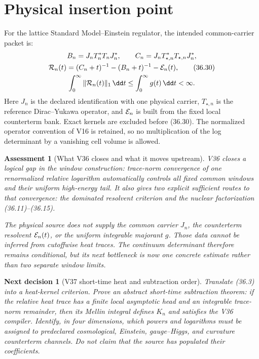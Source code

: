 \documentclass[11pt]{article}
\newtheorem{decision}[theorem]{Next decision}
\newtheorem{assessment}[theorem]{Assessment}
\theoremstyle{remark}
\begin{document}
\section{Physical insertion point}

For the lattice Standard Model--Einstein regulator, the intended
common-carrier packet is:
\[
\begin{gathered}
 B_n=J_nT_n^*T_nJ_n^*,\qquad
 C_n=J_nT_{\star,n}^*T_{\star,n}J_n^*,\\
 {\cal R}_n(t)=
 (C_n+t)^{-1}-(B_n+t)^{-1}-{\cal E}_n(t),                \tag{36.30}\\
 \int_0^\infty\|{\cal R}_n(t)\|_1\,\dd t
 \leq\int_0^\infty g(t)\,\dd t<\infty.
\end{gathered}
\]
Here \(J_n\) is the declared identification with one physical
carrier, \(T_{\star,n}\) is the reference Dirac--Yukawa operator,
and \({\cal E}_n\) is built from the fixed local counterterm bank.
Exact kernels are excluded before (36.30).  The normalized
operator convention of V16 is retained, so no multiplication of the
log determinant by a vanishing cell volume is allowed.

\begin{assessment}[What V36 closes and what it moves upstream]
\label{ass:v15v36-closes}
V36 closes a logical gap in the window construction: trace-norm
convergence of one renormalized relative logarithm automatically
controls all fixed common windows and their uniform high-energy
tail.  It also gives two explicit sufficient routes to that
convergence: the dominated resolvent criterion and the nuclear
factorization (36.11)--(36.15).

The physical source does not supply the common carrier \(J_n\), the
counterterm resolvent \({\cal E}_n(t)\), or the uniform integrable
majorant \(g\).  Those data cannot be inferred from cutoffwise heat
traces.  The continuum determinant therefore remains conditional,
but its next bottleneck is now one concrete estimate rather than two
separate window limits.
\end{assessment}

\begin{decision}[V37 short-time heat and subtraction order]
\label{dec:v15v36-next}
Translate (36.3) into a heat-kernel criterion.  Prove an abstract
short-time subtraction theorem: if the relative heat trace has a
finite local asymptotic head and an integrable trace-norm remainder,
then its Mellin integral defines \(K_n\) and satisfies the V36
compiler.  Identify, in four dimensions, which powers and logarithms
must be assigned to predeclared cosmological, Einstein,
gauge--Higgs, and curvature counterterm channels.  Do not claim that
the source has populated their coefficients.
\end{decision}
\end{document}
